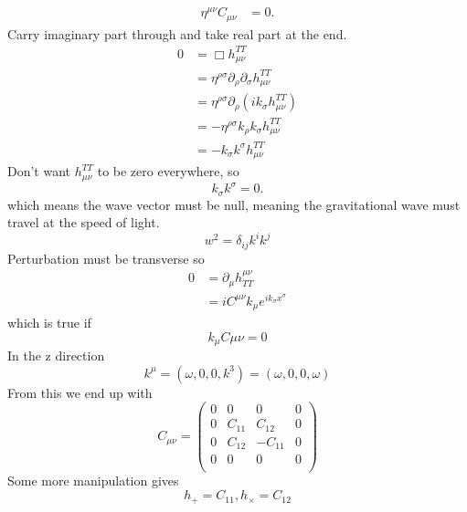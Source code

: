 \documentclass[10pt,landscape,a4paper]{article}
\newcommand{\munu} {\mu\nu}
\begin{document}
\begin{multicols}{3}
\begin{equation}
\begin{split}
\eta^{\munu}C_{\munu} &= 0.
\end{split}
\end{equation}
Carry imaginary part through and take real part at the end.
\begin{equation}
\begin{split}
0 &= \Box h_{\munu}^{TT}\\
&= \eta^{\rho\sigma}\partial_\rho\partial_\sigma h_{\munu}^{TT}\\
&= \eta^{\rho\sigma}\partial_\rho(ik_\sigma h_{\munu}^{TT})\\
&=-\eta^{\rho\sigma}k_\rho k_\sigma h_{\munu}^{TT}\\
&= -k_\sigma k^\sigma h_{\munu}^{TT}
\end{split}
\end{equation}
Don't want $h_{\munu}^{TT}$ to be zero everywhere, so
\begin{equation}
k_\sigma k^\sigma = 0.
\end{equation}
which means the wave vector must be null, meaning the gravitational wave must travel at the speed of light.
\begin{equation}
w^2 = \delta_{ij}k^i k^j
\end{equation}
Perturbation must be transverse so 
\begin{equation}
\begin{split}
0 &= \partial_\mu h^{\munu}_{TT}\\
&= iC^{\munu}k_\mu e^{ik_\sigma x^\sigma}
\end{split}
\end{equation}
which is true if
\begin{equation}
k_\mu C{\munu} = 0
\end{equation}
In the z direction 
\begin{equation}
k^\mu = (\omega,0,0,k^3)=(\omega,0,0,\omega)
\end{equation}
From this we end up with
\begin{equation}
C_{\munu} = \begin{pmatrix}
0&0&0&0\\0&C_{11}&C_{12}&0\\
0&C_{12}&-C_{11}&0\\
0&0&0&0\\
\end{pmatrix}
\end{equation}
Some more manipulation gives 
\begin{equation}
h_+ = C_{11}, h_\times = C_{12}
\end{equation}


\end{multicols}
\end{document}
